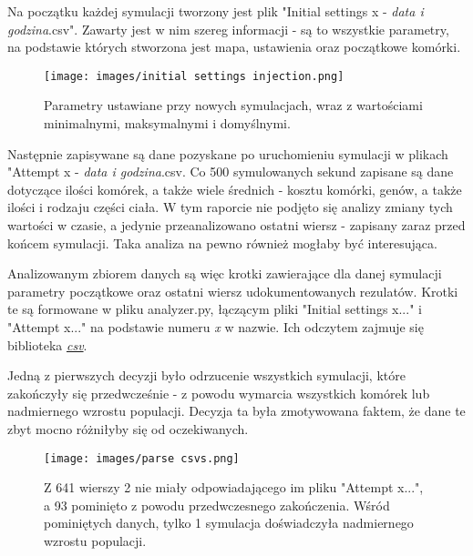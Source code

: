 \documentclass{article}
\begin{document}
Na początku każdej symulacji tworzony jest plik "Initial settings x - \textit{data i godzina}.csv". Zawarty jest w nim szereg informacji - są to wszystkie parametry, na podstawie których stworzona jest mapa, ustawienia oraz początkowe komórki.
\begin{figure}[H]
    \centering
    \texttt{[image: images/initial settings injection.png]}
    \caption{Parametry ustawiane przy nowych symulacjach, wraz z wartościami minimalnymi, maksymalnymi i domyślnymi.}    
\end{figure}

Następnie zapisywane są dane pozyskane po uruchomieniu symulacji w plikach "Attempt x - \textit{data i godzina}.csv. Co 500 symulowanych sekund zapisane są dane dotyczące ilości komórek, a także wiele średnich - kosztu komórki, genów, a także ilości i rodzaju części ciała. W tym raporcie nie podjęto się analizy zmiany tych wartości w czasie, a jedynie przeanalizowano ostatni wiersz - zapisany zaraz przed końcem symulacji. Taka analiza na pewno również mogłaby być interesująca.

Analizowanym zbiorem danych są więc krotki zawierające dla danej symulacji parametry początkowe oraz ostatni wiersz udokumentowanych rezulatów. Krotki te są formowane w pliku analyzer.py, łączącym pliki "Initial settings x..." i "Attempt x..." na podstawie numeru \textit{x} w nazwie. Ich odczytem zajmuje się biblioteka \href{https://docs.python.org/3/library/csv.html}{\textit{csv}}.

Jedną z pierwszych decyzji było odrzucenie wszystkich symulacji, które zakończyły się przedwcześnie - z powodu wymarcia wszystkich komórek lub nadmiernego wzrostu populacji. Decyzja ta była zmotywowana faktem, że dane te zbyt mocno różniłyby się od oczekiwanych.

\begin{figure}[H]
    \centering
    \texttt{[image: images/parse csvs.png]}
    \caption{Z 641 wierszy 2 nie miały odpowiadającego im pliku "Attempt x...", a 93 pominięto z powodu przedwczesnego zakończenia. Wśród pominiętych danych, tylko 1 symulacja doświadczyła nadmiernego wzrostu populacji.}    
\end{figure}
\end{document}
